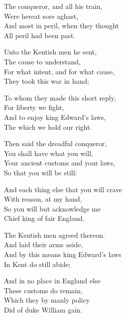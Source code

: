 \begin{dcverse}
\begin{altverse}
The conqueror, and all his train,\\
Were hereat sore aghast,\\
And most in peril, when they thought\\
All peril had been past.
\end{altverse}

\begin{altverse}
Unto the Kentish men he sent,\\
The cause to understand,\\
For what intent, and for what cause,\\
They took this war in hand;
\end{altverse}

\begin{altverse}
To whom they made this short reply,\\
For liberty we fight,\\
And to enjoy king Edward’s laws,\\
The which we hold our right.
\end{altverse}

\begin{altverse}
Then said the dreadful conqueror,\\
You shall have what you will,\\
Your ancient customs and your laws,\\
So that you will be still:
\end{altverse}

\begin{altverse}
And each thing else that you will crave\\
With reason, at my hand,\\
So you will but acknowledge me\\
Chief king of fair England.
\end{altverse}

\begin{altverse}
The Kentish men agreed thereon.\\
And laid their arms aside,\\
And by this means king Edward’s laws\\
In Kent do still abide;
\end{altverse}
\end{dcverse}

\settowidth{\versewidth}{And in no place in England else}
\begin{scverse}\smallskip
\begin{altverse}
And in no place in England else\\
These customs do remain,\\
Which they by manly policy\\
Did of duke William gain.
\end{altverse}
\end{scverse}

